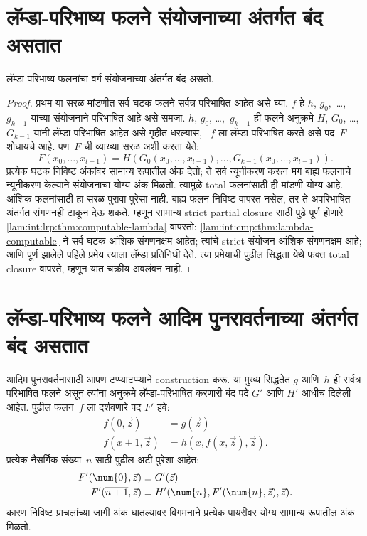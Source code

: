 \section{लॅम्डा-परिभाष्य फलने संयोजनाच्या अंतर्गत बंद असतात}\label{lam:int:com:sec}

\begin{lem}
लॅम्डा-परिभाष्य फलनांचा वर्ग संयोजनाच्या अंतर्गत बंद असतो.
\end{lem}

\begin{proof}

प्रथम या सरळ मांडणीत सर्व घटक फलने सर्वत्र परिभाषित आहेत
असे घ्या. $f$ हे $h$, $g_0,$ \dots,~$g_{k-1}$ यांच्या संयोजनाने
परिभाषित आहे असे समजा. $h$, $g_0$, \dots,~$g_{k-1}$
ही फलने अनुक्रमे $H$, $G_0$, \dots,~$G_{k-1}$
यांनी लॅम्डा-परिभाषित आहेत असे गृहीत धरल्यास,
~$f$ ला लॅम्डा-परिभाषित करते असे पद~$F$ शोधायचे आहे.
पण~$F$ ची व्याख्या सरळ अशी करता येते:
\[F(x_0, \dots, x_{l-1}) = H(G_0(x_0, \dots, x_{l-1}),
\dots, G_{k-1}(x_0, \dots, x_{l-1})).
\]
प्रत्येक घटक निविष्ट अंकांवर सामान्य रूपातील अंक देतो;
ते सर्व न्यूनीकरण करून मग बाह्य फलनाचे न्यूनीकरण केल्याने
संयोजनाचा योग्य अंक मिळतो. त्यामुळे total फलनांसाठी ही
मांडणी योग्य आहे.
आंशिक फलनांसाठी हा सरळ पुरावा पुरेसा नाही. बाह्य फलन
निविष्ट वापरत नसेल, तर ते अपरिभाषित अंतर्गत संगणनही
टाकून देऊ शकते. म्हणून सामान्य strict partial closure साठी
पुढे पूर्ण होणारे \ref{lam:int:lrp:thm:computable-lambda} वापरतो:
\ref{lam:int:cmp:thm:lambda-computable} ने सर्व घटक आंशिक संगणनक्षम
आहेत; त्यांचे strict संयोजन आंशिक संगणनक्षम आहे; आणि
पूर्ण झालेले पहिले प्रमेय त्याला लॅम्डा प्रतिनिधी देते.
त्या प्रमेयाची पुढील सिद्धता येथे फक्त total closure वापरते,
म्हणून यात चक्रीय अवलंबन नाही.
\end{proof}











\section{लॅम्डा-परिभाष्य फलने आदिम पुनरावर्तनाच्या अंतर्गत बंद असतात}\label{lam:int:pr:sec}


आदिम पुनरावर्तनासाठी आपण टप्प्याटप्प्याने construction करू.
या मुख्य सिद्धतेत $g$ आणि~$h$ ही सर्वत्र परिभाषित फलने असून
त्यांना अनुक्रमे लॅम्डा-परिभाषित करणारी बंद पदे $G'$ आणि $H'$
आधीच दिलेली आहेत. पुढील फलन~$f$ ला दर्शवणारे पद $F'$ हवे:
\begin{align*}
f(0, \vec z) & = g(\vec z) \\
f(x+1, \vec z) & = h(x, f(x,\vec z), \vec z).
\end{align*}
प्रत्येक नैसर्गिक संख्या~$n$ साठी पुढील अटी पुरेशा आहेत:
\begin{align*}
F'(\num{0}, \vec z) & \equiv G'(\vec z) \\
F'(\overline{n+1}, \vec z) & \equiv H'(\num{n}, F'(\num{n}, \vec z), \vec z).
\end{align*}
कारण निविष्ट प्राचलांच्या जागी अंक घातल्यावर विगमनाने
प्रत्येक पायरीवर योग्य सामान्य रूपातील अंक मिळतो.

